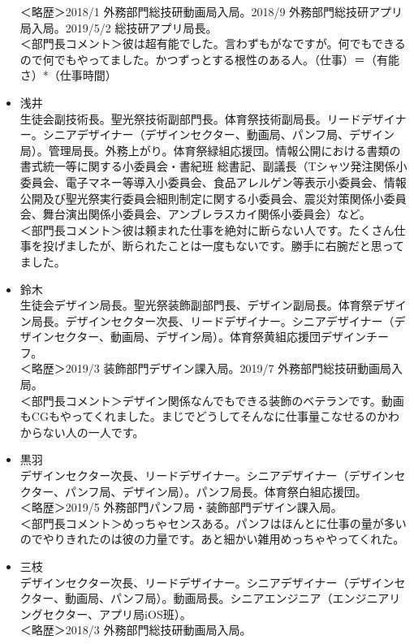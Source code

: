 \documentclass[a4paper]{ltjsreport}
\begin{document}
\begin{itemize}
        ＜略歴＞2018/1 外務部門総技研動画局入局。2018/9 外務部門総技研アプリ局入局。2019/5/2 総技研アプリ局長。\\
        ＜部門長コメント＞彼は超有能でした。言わずもがなですが。何でもできるので何でもやってました。かつずっとする根性のある人。（仕事）＝（有能さ）*（仕事時間）
  \item 浅井\\
        生徒会副技術長。聖光祭技術副部門長。体育祭技術副局長。リードデザイナー。シニアデザイナー（デザインセクター、動画局、パンフ局、デザイン局）。管理局長。外務上がり。体育祭緑組応援団。情報公開における書類の書式統一等に関する小委員会・書紀班 総書記、副議長（Tシャツ発注関係小委員会、電子マネー等導入小委員会、食品アレルゲン等表示小委員会、情報公開及び聖光祭実行委員会細則制定に関する小委員会、震災対策関係小委員会、舞台演出関係小委員会、アンブレラスカイ関係小委員会）など。\\
        ＜部門長コメント＞彼は頼まれた仕事を絶対に断らない人です。たくさん仕事を投げましたが、断られたことは一度もないです。勝手に右腕だと思ってました。
  \item 鈴木\\
        生徒会デザイン局長。聖光祭装飾副部門長、デザイン副局長。体育祭デザイン局長。デザインセクター次長、リードデザイナー。シニアデザイナー（デザインセクター、動画局、デザイン局）。体育祭黄組応援団デザインチーフ。\\
        ＜略歴＞2019/3 装飾部門デザイン課入局。2019/7 外務部門総技研動画局入局。\\
        ＜部門長コメント＞デザイン関係なんでもできる装飾のベテランです。動画もCGもやってくれました。まじでどうしてそんなに仕事量こなせるのかわからない人の一人です。
  \item 黒羽\\
        デザインセクター次長、リードデザイナー。シニアデザイナー（デザインセクター、パンフ局、デザイン局）。パンフ局長。体育祭白組応援団。\\
        ＜略歴＞2019/5 外務部門パンフ局・装飾部門デザイン課入局。\\
        ＜部門長コメント＞めっちゃセンスある。パンフはほんとに仕事の量が多いのでやりきれたのは彼の力量です。あと細かい雑用めっちゃやってくれた。
  \item 三枝\\
        デザインセクター次長、リードデザイナー。シニアデザイナー（デザインセクター、動画局、パンフ局）。動画局長。シニアエンジニア（エンジニアリングセクター、アプリ局iOS班）。\\
        ＜略歴＞2018/3 外務部門総技研動画局入局。\\

\end{itemize}
\end{document}
